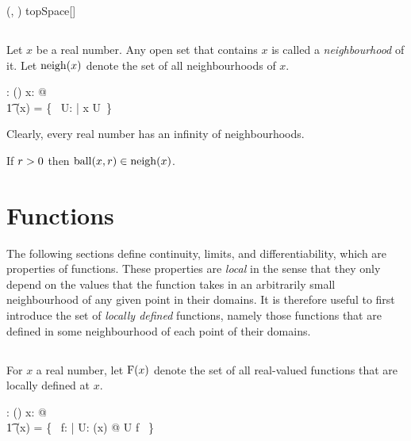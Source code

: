 \documentclass[11pt, oneside]{article}
\begin{document}
\begin{example}

\begin{zed}
	(\R, \tauR) \in topSpace[\R]
\end{zed}

\end{example}

\subsection{}

Let $x$ be a real number.
Any open set that contains $x$ is called a {\it neighbourhood} of it.
Let $\operatorname{neigh}(x)$ denote the set of all neighbourhoods of $x$.

\begin{axdef}
	\neighR: \R \fun \power (\power \R)
\where
	\forall x: \R @ \\
	\t1	\neighR(x) = \{~ U: \openR | x \in U~\}
\end{axdef}

Clearly, every real number has an infinity of neighbourhoods.

\begin{remark}
If $r \mathrel{>} 0$ then $\operatorname{ball}(x, r) \in \operatorname{neigh}(x)$.
\end{remark}

\section{Functions}

The following sections define continuity, limits, and differentiability, which are properties of functions.
These properties are {\it local} in the sense that they only depend on the values that the function takes in 
an arbitrarily small neighbourhood of any given point in their domains.
It is therefore useful to first introduce the set of {\it locally defined} functions, 
namely those functions that are defined in some neighbourhood of each point of  their domains.

\subsection{}

For $x$ a real number,
let $\operatorname{F}(x)$ denote the set of all real-valued functions that are locally defined at $x$.

\begin{axdef}
	\FunR: \R \fun \power(\R \pfun \R)
\where
	\forall x: \R @ \\
	\t1	\FunR(x) = \{~ f: \R \pfun \R | \exists U: \neighR(x) @ U \subseteq \dom f ~\}
\end{axdef}
\end{document}
